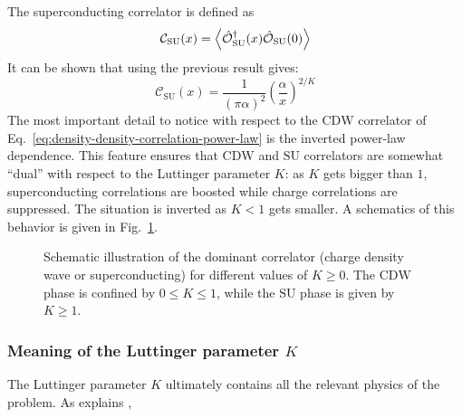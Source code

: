 The superconducting correlator is defined as
\[
	\mathcal{C}_\mathrm{SU}(x) = \ev{\hat{\mathcal{O}}_\mathrm{SU}^\dagger(x) \hat{\mathcal{O}}_\mathrm{SU}(0)}
\]
It can be shown that using the previous result gives:
\begin{equation}\label{eq:superconducting-correlation-power-law}
	\mathcal{C}_\mathrm{SU}(x) = \frac{1}{(\pi\alpha)^2} \left(
		\frac{\alpha}{x}
	\right)^{2/K}
\end{equation}
The most important detail to notice with respect to the $\mathrm{CDW}$ correlator of Eq.~\eqref{eq:density-density-correlation-power-law} is the inverted power-law dependence. This feature ensures that $\mathrm{CDW}$ and $\mathrm{SU}$ correlators are somewhat ``dual'' with respect to the Luttinger parameter $K$: as $K$ gets bigger than $1$, superconducting correlations are boosted while charge correlations are suppressed. The situation is inverted as $K<1$ gets smaller. A schematics of this behavior is given in Fig.~\ref{fig:k-luttinger-phases}.

\begin{figure}
	\centering
	
	\caption{Schematic illustration of the dominant correlator (charge density wave or superconducting) for different values of $K \ge 0$. The $\mathrm{CDW}$ phase is confined by $0 \le K \le 1$, while the $\mathrm{SU}$ phase is given by $K \ge 1$.}
	\label{fig:k-luttinger-phases}
\end{figure}

\subsubsection{Meaning of the Luttinger parameter $K$}\label{subsubsec:meaning-of-the-luttinger-parameter-K}

The Luttinger parameter $K$ ultimately contains all the relevant physics of the problem. As \citeauthor{giamarchi2003quantum} explains \cite[Sec.~2.2.2]{giamarchi2003quantum}, \todo
